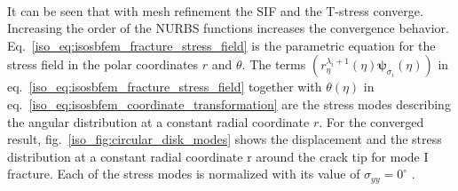 \paragraph{}
It can be seen that with mesh refinement the SIF and the T-stress converge.
Increasing the order of the NURBS functions increases the convergence behavior.
Eq.~\ref{iso_eq:isosbfem_fracture_stress_field} is the parametric equation for the stress field in the polar coordinates $r$ and $\theta$.
The terms $\left(
        r_\eta^{\lambda_i+1}(\eta)
        \boldsymbol{\psi}_{\sigma_i}(\eta)
    \right)$
in eq.~\ref{iso_eq:isosbfem_fracture_stress_field} together with $\theta(\eta)$ in eq.~\ref{iso_eq:isosbfem_coordinate_transformation} are the stress modes describing the angular distribution at a constant radial coordinate $r$.
For the converged result, fig.~\ref{iso_fig:circular_disk_modes} shows the displacement and the stress distribution at a constant radial coordinate r around the crack tip for mode \RN{1} fracture.
Each of the stress modes is normalized with its value of $\sigma_{yy}=0^\circ$ .
